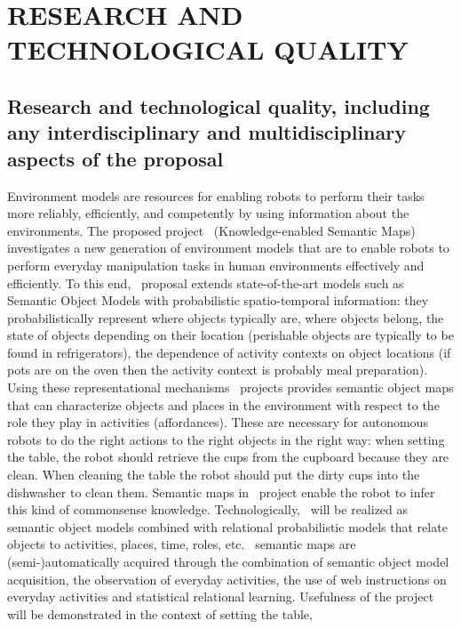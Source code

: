 \section{RESEARCH AND TECHNOLOGICAL QUALITY} %
\label{sec:quality}
\subsection{Research and technological quality, including any interdisciplinary and multidisciplinary 
aspects of the proposal}
\label{sec:q1}
Environment models are resources  for enabling robots to perform their
tasks more reliably, efficiently, and competently by using information
about the  environments. The proposed  project \ksem\ (Knowledge-enabled
Semantic Maps) investigates a new generation of environment models that
are to enable  robots to perform everyday manipulation  tasks in human
environments effectively and efficiently.   To this end, \ksem\ proposal
extends state-of-the-art  models such  as Semantic Object  Models with
probabilistic  spatio-temporal   information:  they  probabilistically
represent where objects typically are, where objects belong, the state
of  objects  depending  on  their  location  (perishable  objects  are
typically to  be found in  refrigerators), the dependence  of activity
contexts  on  object locations  (if  pots are  on  the  oven then  the
activity   context  is   probably  meal   preparation).   Using  these
representational mechanisms \ksem\ projects provides semantic object maps that can
characterize objects and places in the environment with respect to the
role they  play in activities  (affordances). These are  necessary for
autonomous robots to do the right  actions to the right objects in the
right way: when setting the  table, the robot should retrieve the cups
from the cupboard because they  are clean. When cleaning the table the
robot  should  put  the  dirty  cups  into  the  dishwasher  to  clean
them.  Semantic maps in \ksem\ project  enable the  robot  to  infer  this kind  of  commonsense
knowledge.   Technologically,  \ksem \ will  be realized as  semantic object  models
combined with  relational probabilistic models that  relate objects to
activities, places,  time, roles, etc.  \ksem\ semantic maps are (semi-)automatically
acquired through the combination of semantic object model acquisition,
the observation of everyday activities, the use of web instructions on
everyday activities and statistical relational learning. Usefulness of 
the \ksem project will be demonstrated  in the context of  setting  the  table, 
